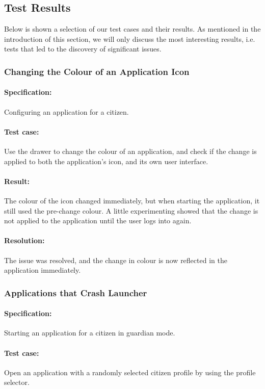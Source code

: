 \subsection{Test Results}\label{sec:sprint1:testing_results}
Below is shown a selection of our test cases and their results.
As mentioned in the introduction of this section, we will only discuss the most interesting results, i.e. tests that led to the discovery of significant issues.

\subsubsection{Changing the Colour of an Application Icon}

\paragraph{Specification:} Configuring an application for a citizen.
\paragraph{Test case:} Use the drawer to change the colour of an application, and check if the change is applied to both the application's icon, and its own user interface.
\paragraph{Result:} The colour of the icon changed immediately, but when starting the application, it still used the pre-change colour. 
A little experimenting showed that the change is not applied to the application until the user logs into \launcher again.
\paragraph{Resolution:} The issue was resolved, and the change in colour is now reflected in the application immediately.

\subsubsection{Applications that Crash Launcher}

\paragraph{Specification:} Starting an application for a citizen in guardian mode.
\paragraph{Test case:} Open an application with a randomly selected citizen profile by using the profile selector.
